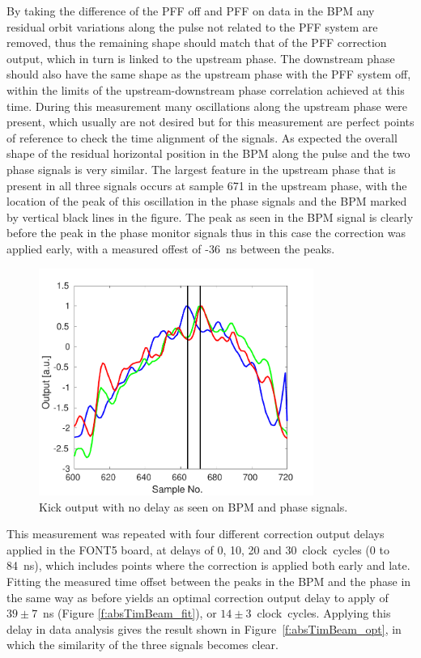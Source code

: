 By taking the difference of the PFF off and PFF on data in the BPM any residual orbit variations along the pulse not related to the PFF system are removed, thus the remaining shape should match that of the PFF correction output, which in turn is linked to the upstream phase. The downstream phase should also have the same shape as the upstream phase with the PFF system off, within the limits of the upstream-downstream phase correlation achieved at this time. During this measurement many oscillations along the upstream phase were present, which usually are not desired but for this measurement are perfect points of reference to check the time alignment of the signals. As expected the overall shape of the residual horizontal position in the BPM along the pulse and the two phase signals is very similar. The largest feature in the upstream phase that is present in all three signals occurs at sample 671 in the upstream phase, with the location of the peak of this oscillation in the phase signals and the BPM marked by vertical black lines in the figure. The peak as seen in the BPM signal is clearly before the peak in the phase monitor signals thus in this case the correction was applied early, with a measured offest of -36~ns between the peaks.

\begin{figure}
  \centering
  \includegraphics[width=0.8\textwidth]{Figures/commissioning/absTimBeam_d0}
  \caption{Kick output with no delay as seen on BPM and phase signals.}
  \label{f:absTimBeam_d0}
\end{figure}

This measurement was repeated with four different correction output delays applied in the FONT5 board, at delays of 0, 10, 20 and 30~clock~cycles (0 to 84~ns), which includes points where the correction is applied both early and late. Fitting the measured time offset between the peaks in the BPM and the phase in the same way as before yields an optimal correction output delay to apply of \(39\pm7\)~ns (Figure \ref{f:absTimBeam_fit}), or \(14\pm3\)~clock~cycles. Applying this delay in data analysis gives the result shown in Figure~\ref{f:absTimBeam_opt}, in which the similarity of the three signals becomes clear.

